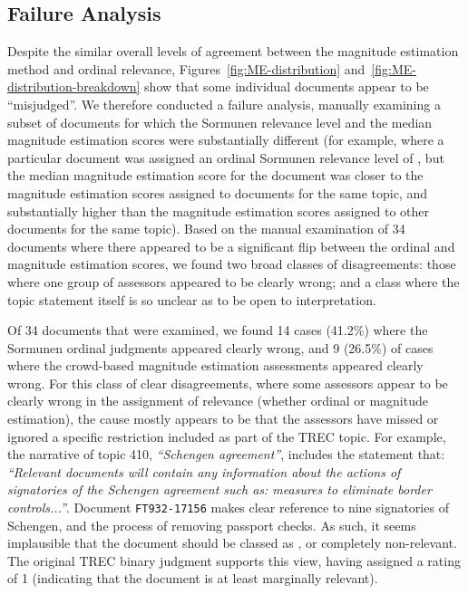 \subsection{Failure Analysis}
\label{sec:failure-analysis}

Despite the similar overall levels of agreement between the magnitude
estimation method and ordinal relevance,
Figures~\ref{fig:ME-distribution}
and~\ref{fig:ME-distribution-breakdown} show that some individual
documents appear to be ``misjudged''.
We therefore conducted a failure analysis, manually examining a subset
of documents for which the Sormunen relevance level and the median
magnitude estimation scores were substantially different (for example,
where a particular document was assigned an ordinal Sormunen relevance
level of \nn, but the median magnitude estimation score for the
document was closer to the magnitude estimation scores assigned to \hh
documents for the same topic, and substantially higher than the
magnitude estimation scores assigned to other \nn documents for
the same topic).
Based on the manual examination of 34 documents where there appeared to
be a significant flip between the ordinal and magnitude estimation
scores, we found two broad classes of disagreements: those where one
group of assessors appeared to be clearly wrong; and a class
where the topic statement itself is so unclear as to be open to
interpretation.

Of 34 documents that were examined, we found 14 cases (41.2\%) where
the Sormunen ordinal judgments appeared clearly wrong, and 9 (26.5\%)
of cases where the crowd-based magnitude estimation assessments
appeared clearly wrong.
For this class of clear disagreements, where some assessors appear to
be clearly wrong in the assignment of relevance (whether ordinal or
magnitude estimation), the cause mostly appears to be that the
assessors have missed or ignored a specific restriction included as
part of the TREC topic.
For example, the narrative of topic 410, \emph{``Schengen agreement''},
includes the statement that: \emph{``Relevant documents will contain
any information about the actions of signatories of the Schengen
agreement such as: measures to eliminate border controls...''}.
Document {\tt FT932-17156} makes clear reference to nine signatories of
Schengen, and the process of removing passport checks.
As such, it seems implausible that the document should be classed as 
\nn, or completely non-relevant. The original TREC binary judgment
supports this view, having assigned a rating of 1 (indicating that the
document is at least marginally relevant).

